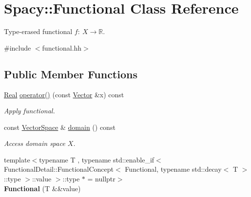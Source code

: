 \hypertarget{classSpacy_1_1Functional}{\section{\-Spacy\-:\-:\-Functional \-Class \-Reference}
\label{classSpacy_1_1Functional}
}


\-Type-\/erased functional $f:\ X \to \mathbb{R} $.  




{\ttfamily \#include $<$functional.\-hh$>$}

\subsection*{\-Public \-Member \-Functions}
\begin{DoxyCompactItemize}
\item 
\hypertarget{classSpacy_1_1Functional_af51f903133f2fbf92cf12f790e429919}{\hyperlink{classSpacy_1_1Real}{\-Real} \hyperlink{classSpacy_1_1Functional_af51f903133f2fbf92cf12f790e429919}{operator()} (const \hyperlink{classSpacy_1_1Vector}{\-Vector} \&x) const }\label{classSpacy_1_1Functional_af51f903133f2fbf92cf12f790e429919}

\begin{DoxyCompactList}\small\item\em \-Apply functional. \end{DoxyCompactList}\item 
\hypertarget{classSpacy_1_1Functional_a6f4ada552c025579bcce852316a071be}{const \hyperlink{classSpacy_1_1VectorSpace}{\-Vector\-Space} \& \hyperlink{classSpacy_1_1Functional_a6f4ada552c025579bcce852316a071be}{domain} () const }\label{classSpacy_1_1Functional_a6f4ada552c025579bcce852316a071be}

\begin{DoxyCompactList}\small\item\em \-Access domain space $X$. \end{DoxyCompactList}\item 
\hypertarget{classSpacy_1_1Functional_a7cda76dbec505fdf667e6023c064bde9}{{\footnotesize template$<$typename T , typename std\-::enable\-\_\-if$<$ Functional\-Detail\-::\-Functional\-Concept$<$ Functional, typename std\-::decay$<$ T $>$\-::type $>$\-::value $>$\-::type $\ast$  = nullptr$>$ }\\{\bfseries \-Functional} (\-T \&\&value)}\label{classSpacy_1_1Functional_a7cda76dbec505fdf667e6023c064bde9}


\end{DoxyCompactItemize}
